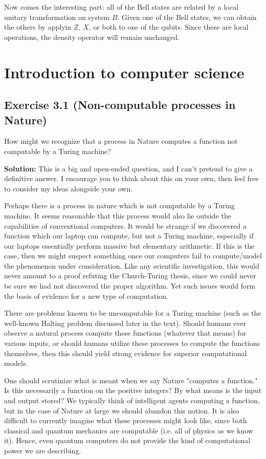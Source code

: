 \documentclass{book}
\begin{document}
    Now comes the interesting part: all of the Bell states are related by a local unitary transformation on system $B$. Given one of the Bell states, we can obtain the others by applyin $Z$, $X$, or both to one of the qubits. Since these are local operations, the density operator will remain unchanged. 
    
\chapter{Introduction to computer science}

\section*{Exercise 3.1 (Non-computable processes in Nature)}
    How might we recognize that a process in Nature computes a function not computable by a Turing machine?

    \textbf{Solution:} This is a big and open-ended question, and I can't pretend to give a definitive answer. I encourage you to think about this on your own, then feel free to consider my ideas alongside your own.

    Perhaps there is a process in nature which is not computable by a Turing machine. It seems reasonable that this process would also lie outside the capabilities of conventional computers. It would be strange if we discovered a function which our laptop can compute, but not a Turing machine, especially if our laptops essentially perform massive but elementary arithmetic. If this is the case, then we might suspect something once our computers fail to compute/model the phenomenon under consideration. Like any scientific investigation, this would never amount to a proof refuting the Church-Turing thesis, since we could never be sure we had not discovered the proper algorithm. Yet such issues would form the basis of evidence for a new type of computation. 

    There are problems known to be uncomputable for a Turing machine (such as the well-known Halting problem discussed later in the text). Should humans ever observe a natural process compute these functions (whatever that means) for various inputs, or should humans utilize these processes to compute the functions themselves, then this should yield strong evidence for superior computational models.

    One should scrutinize what is meant when we say Nature "computes a function." Is this necessarily a function on the positive integers? By what means is the input and output stored? We typically think of intelligent agents computing a function, but in the case of Nature at large we should abandon this notion. It is also difficult to currently imagine what these processes might look like, since both classical and quantum mechanics are computable (i.e. all of physics as we know it). Hence, even quantum computers do not provide the kind of computational power we are describing. 
\end{document}
